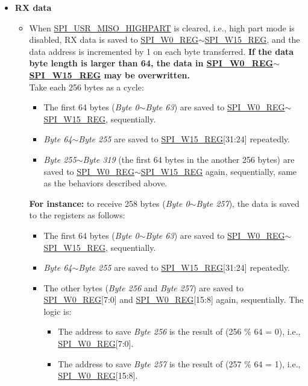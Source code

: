 \documentclass[main\_\_EN.tex]{subfiles}
\begin{document}
\begin{itemize}
    \item \textbf{RX data}
    \begin{itemize}
        \item When \hyperref[fielddesc:SPIUSRMISOHIGHPART]{SPI\_USR\_MISO\_HIGHPART} is cleared, i.e., high part mode is disabled, RX data is saved to \hyperref[regdesc:SPIW0REG]{SPI\_W0\_REG}$\sim$\hyperref[regdesc:SPIW0REG]{SPI\_W15\_REG}, and the data address is incremented by 1 on each byte transferred. \textbf{If the data byte length is larger than 64, the data in \hyperref[regdesc:SPIW0REG]{SPI\_W0\_REG}$\sim$\hyperref[regdesc:SPIW0REG]{SPI\_W15\_REG} may be overwritten.} \\
        Take each 256 bytes as a cycle:
        \begin{itemize}
            \item The first 64 bytes (\emph{Byte 0}$\sim$\emph{Byte 63}) are saved to \hyperref[regdesc:SPIW0REG]{SPI\_W0\_REG}$\sim$\hyperref[regdesc:SPIW0REG]{SPI\_W15\_REG}, sequentially.
            \item \emph{Byte 64}$\sim$\emph{Byte 255} are saved to \hyperref[regdesc:SPIW0REG]{SPI\_W15\_REG}[31:24] repeatedly.
            \item \emph{Byte 255}$\sim$\emph{Byte 319} (the first 64 bytes in the another 256 bytes) are saved to \hyperref[regdesc:SPIW0REG]{SPI\_W0\_REG}$\sim$\hyperref[regdesc:SPIW0REG]{SPI\_W15\_REG} again, sequentially, same as the behaviors described above.
        \end{itemize}

        \textbf{For instance:} to receive 258 bytes (\emph{Byte 0}$\sim$\emph{Byte 257}), the data is saved to the registers as follows:
        \begin{itemize}
            \item The first 64 bytes (\emph{Byte 0}$\sim$\emph{Byte 63}) are saved to \hyperref[regdesc:SPIW0REG]{SPI\_W0\_REG}$\sim$\hyperref[regdesc:SPIW0REG]{SPI\_W15\_REG}, sequentially.
            \item \emph{Byte 64}$\sim$\emph{Byte 255} are saved to \hyperref[regdesc:SPIW0REG]{SPI\_W15\_REG}[31:24] repeatedly.
            \item The other bytes (\emph{Byte 256} and \emph{Byte 257}) are saved to \hyperref[regdesc:SPIW0REG]{SPI\_W0\_REG}[7:0] and \hyperref[regdesc:SPIW0REG]{SPI\_W0\_REG}[15:8] again, sequentially. The logic is:
            \begin{itemize}
                \item The address to save \emph{Byte 256} is the result of (256 \% 64 = 0), i.e., \hyperref[regdesc:SPIW0REG]{SPI\_W0\_REG}[7:0].
                \item The address to save \emph{Byte 257} is the result of (257 \% 64 = 1), i.e., \hyperref[regdesc:SPIW0REG]{SPI\_W0\_REG}[15:8].
            \end{itemize}
        \end{itemize}


\end{itemize}
\end{itemize}
\end{document}
